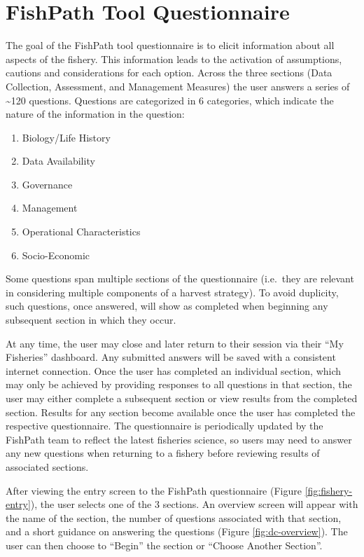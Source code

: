 \documentclass[
  11pt,
]{book}
\providecommand{\tightlist}{%
  \setlength{\itemsep}{0pt}\setlength{\parskip}{0pt}}
\begin{document}
\hypertarget{fishpath-tool-questionnaire}{%
\chapter{FishPath Tool Questionnaire}\label{fishpath-tool-questionnaire}}

The goal of the FishPath tool questionnaire is to elicit information about all aspects of the fishery. This information leads to the activation of assumptions, cautions and considerations for each option. Across the three sections (Data Collection, Assessment, and Management Measures) the user answers a series of \textasciitilde120 questions. Questions are categorized in 6 categories, which indicate the nature of the information in the question:

\begin{enumerate}
\def\labelenumi{\arabic{enumi}.}
\tightlist
\item
  Biology/Life History
\item
  Data Availability
\item
  Governance
\item
  Management
\item
  Operational Characteristics
\item
  Socio-Economic
\end{enumerate}

Some questions span multiple sections of the questionnaire (i.e.~they are relevant in considering multiple components of a harvest strategy). To avoid duplicity, such questions, once answered, will show as completed when beginning any subsequent section in which they occur.

At any time, the user may close and later return to their session via their ``My Fisheries'' dashboard. Any submitted answers will be saved with a consistent internet connection. Once the user has completed an individual section, which may only be achieved by providing responses to all questions in that section, the user may either complete a subsequent section or view results from the completed section. Results for any section become available once the user has completed the respective questionnaire. The questionnaire is periodically updated by the FishPath team to reflect the latest fisheries science, so users may need to answer any new questions when returning to a fishery before reviewing results of associated sections.

After viewing the entry screen to the FishPath questionnaire (Figure \ref{fig:fishery-entry}), the user selects one of the 3 sections. An overview screen will appear with the name of the section, the number of questions associated with that section, and a short guidance on answering the questions (Figure \ref{fig:dc-overview}). The user can then choose to ``Begin'' the section or ``Choose Another Section''.
\end{document}
